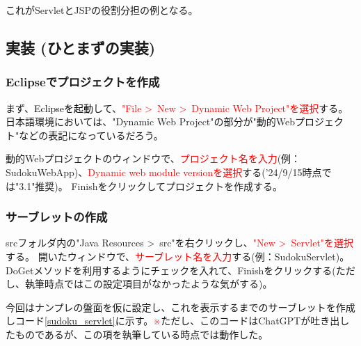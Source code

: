 \documentclass[a4paper,10pt]{jsarticle}
\begin{document}
    これがServletとJSPの役割分担の例となる。

  \subsection{実装 (ひとまずの実装)}
    \subsubsection{Eclipseでプロジェクトを作成}
      まず、\textcolor{black}{Eclipseを起動}して、\textcolor{red}{"File \textgreater \ New \textgreater \ Dynamic Web Project"を選択}する。
      日本語環境においては、"Dynamic Web Project"の部分が"動的Webプロジェクト"などの表記になっているだろう。

      動的Webプロジェクトのウィンドウで、\textcolor{red}{プロジェクト名を入力}(例：SudokuWebApp)、\textcolor{red}{Dynamic web module versionを選択}する('24/9/15時点では"3.1"推奨)。
      Finishをクリックしてプロジェクトを作成する。
    \subsubsection{サーブレットの作成}
      srcフォルダ内の"Java Resources \textgreater \ src"を右クリックし、\textcolor{red}{"New \textgreater \ Servlet"を選択}する。
      開いたウィンドウで、\textcolor{red}{サーブレット名を入力}する(例：SudokuServlet)。
      DoGetメソッドを利用するようにチェックを入れて、Finishをクリックする(ただし、執筆時点ではこの設定項目がなかったような気がする)。

      今回はナンプレの盤面を仮に設定し、これを表示するまでのサーブレットを作成しコード\ref{sudoku_servlet}に示す。\textcolor{red}{※}ただし、このコードはChatGPTが吐き出したものであるが、この項を執筆している時点では動作した。\\
\end{document}
